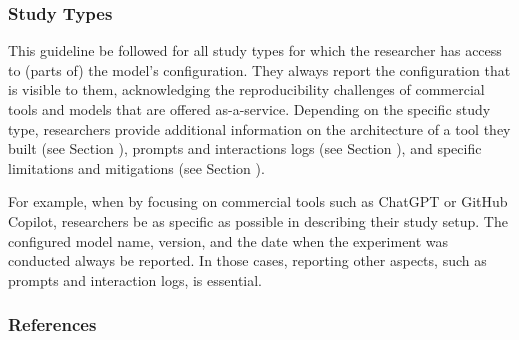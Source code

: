 \subsubsection{Study Types}

This guideline \must be followed for all study types for which the researcher has access to (parts of) the model's configuration.
They \must always report the configuration that is visible to them, acknowledging the reproducibility challenges of commercial tools and models that are offered as-a-service. 
Depending on the specific study type, researchers \should provide additional information on the architecture of a tool they built (see Section \toolarchitecture), prompts and interactions logs (see Section \prompts), and specific limitations and mitigations (see Section \limitationsmitigations).

For example, when \llmusage by focusing on commercial tools such as ChatGPT or GitHub Copilot, researchers \must be as specific as possible in describing their study setup.
The configured model name, version, and the date when the experiment was conducted \must always be reported.
In those cases, reporting other aspects, such as prompts and interaction logs, is essential.

\subsubsection{References}





